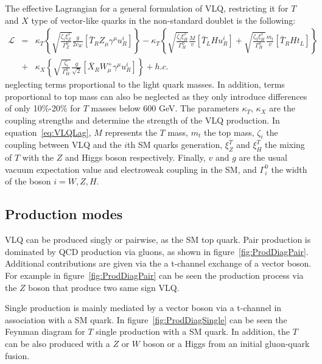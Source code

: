 The effective Lagrangian for a general formulation of VLQ, restricting it for $T$ and $X$ type of vector-like quarks in the non-standard doublet is the following:
\begin{eqnarray}
  \mathcal{L} & = & \kappa_{T}\left\{ \sqrt{\frac{\zeta_{i}\xi_{Z}^{T}}{\Gamma_{Z}^{0}}}\frac{g}{2c_{W}}\left[ \bar{T}_{R}Z_{\mu}\gamma^{\mu}u^{i}_{R}\right]\right\} 
               -  \kappa_{T}\left\{ \sqrt{\frac{\zeta_{i}\xi_{H}^{T}}{\Gamma_{H}^{0}}}\frac{M}{v}\left[ \bar{T}_{L}Hu^{i}_{R}\right] + \sqrt{\frac{\zeta_{3}\xi_{H}^{T}}{\Gamma_{H}^{0}}}\frac{m_{t}}{v}\left[ \bar{T}_{R}Ht_{L}\right]\right\} \nonumber\\            
              & + & \kappa_{X}\left\{ \sqrt{\frac{\zeta_{i}}{\Gamma_{W}^{0}}}\frac{g}{\sqrt{2}}\left[ \bar{X}_{R}W^{+}_{\mu}\gamma^{\mu}u^{i}_{R}\right]\right\} +h.c.
\label{eq:VLQLag}
\end{eqnarray} 
neglecting terms proportional to the light quark masses. In addition, terms proportional to top mass can also be neglected as they only introduce differences of only 10\%-20\% for $T$ masses below 600 GeV. The parameters $\kappa_T$, $\kappa_X$ are the coupling strengths and determine the strength of the VLQ production. In equation~\ref{eq:VLQLag}, $M$ represents the $T$ mass, $m_{t}$ the top mass, $\zeta_{i}$ the coupling between VLQ and the $i$th SM quarks generation, $\xi_{Z}^{T}$ and $\xi_{H}^{T}$  the mixing of $T$ with the $Z$ and Higgs boson respectively. Finally, $v$ and $g$ are the usual vacuum expectation value and electroweak coupling in the SM, and $\Gamma^{0}_{i}$ the width of the boson $i=W,Z,H$.

\subsection{Production modes}
\label{sec:prod}

VLQ can be produced singly or pairwise, as the SM top quark. Pair production is dominated by QCD production via gluons, as shown in figure~\ref{fig:ProdDiagPair}. Additional contributions are given via the a t-channel exchange of a vector boson. For example in figure~\ref{fig:ProdDiagPair} can be seen the production process via the $Z$ boson that produce two same sign VLQ.   

Single production is mainly mediated by a vector boson via a t-channel in association with a SM quark. In figure~\ref{fig:ProdDiagSingle} can be seen the Feynman diagram for $T$ single production with a SM quark. In addition, the $T$ can be also produced with a $Z$ or $W$ boson or a Higgs from an initial gluon-quark fusion. 

